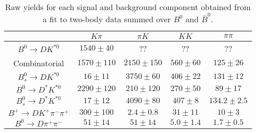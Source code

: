 \begin{table}
  \centering
  \begin{tabular}{ccccc}
      \toprule
       & $K\pi$ & $\pi K$ & $KK$ & $\pi\pi$ \\
      \midrule
      $B^0 \to DK^{*0}$ & $1540 \pm 40$ & ?? & ?? & ?? \\
      Combinatorial & $1570 \pm 110$ & $2150 \pm 150$ & $560 \pm 60$ & $125 \pm 26$ \\
      $B^0_s \to DK^{*0}$ & $16 \pm 11$ & $3750 \pm 60$ & $406 \pm 22$ & $131 \pm 12$ \\
      $B^0 \to D^*K^{*0}$ & $2290 \pm 120$ & $210 \pm 120$ & $270 \pm 50$ & $89 \pm 17$ \\
      $B^0_s \to D^*K^{*0}$ & $17 \pm 12$ & $4090 \pm 80$ & $407 \pm 8$ & $134.2 \pm 2.5$ \\
      $B^+ \to DK^+\pi^-\pi^+$ & $300 \pm 100$ & $2.4 \pm 0.8$ & $31 \pm 11$ & $10 \pm 3$ \\
      $B^0 \to D\pi^+\pi^-$ & $51 \pm 14$ & $51 \pm 14$ & $5.0 \pm 1.4$ & $1.7 \pm 0.5$ \\
      \bottomrule
      \end{tabular}
  \caption{Raw yields for each signal and background component obtained from a fit to two-body data summed over $B^0$ and $\bar{B}^0$.}
\label{tab:yields_combined_2body}
\end{table}

